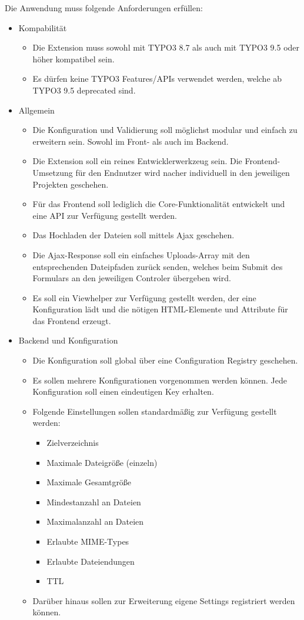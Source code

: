 Die Anwendung muss folgende Anforderungen erfüllen: 
\begin{itemize}[itemsep=0em,partopsep=0em,parsep=0em,topsep=0em]
\item Kompabilität
	\begin{itemize}
		\item Die Extension muss sowohl mit TYPO3 8.7 als auch mit TYPO3 9.5 oder höher kompatibel sein.
		\item Es dürfen keine TYPO3 Features/APIs verwendet werden, welche ab TYPO3 9.5 deprecated sind.
	\end{itemize}
\item Allgemein
	\begin{itemize}
		\item Die Konfiguration und Validierung soll möglichst modular und einfach zu erweitern sein. Sowohl im Front- als auch im Backend.
		\item Die Extension soll ein reines Entwicklerwerkzeug sein. Die Frontend-Umsetzung für den Endnutzer wird nacher individuell in den jeweiligen Projekten geschehen.
		\item Für das Frontend soll lediglich die Core-Funktionalität entwickelt und eine API zur Verfügung gestellt werden.
		\item Das Hochladen der Dateien soll mittels Ajax geschehen.
		\item Die Ajax-Response soll ein einfaches Uploads-Array mit den entsprechenden Dateipfaden zurück senden, welches beim Submit des Formulars an den jeweiligen Controler übergeben wird.
		\item Es soll ein Viewhelper zur Verfügung gestellt werden, der eine Konfiguration lädt und die nötigen HTML-Elemente und Attribute für das Frontend erzeugt.
	\end{itemize}
\item Backend und Konfiguration
	\begin{itemize}
		\item Die Konfiguration soll global über eine Configuration Registry geschehen.
		\item Es sollen mehrere Konfigurationen vorgenommen werden können. Jede Konfiguration soll einen eindeutigen Key erhalten.
		\item Folgende Einstellungen sollen standardmäßig zur Verfügung gestellt werden:
			\begin{itemize}
				\item Zielverzeichnis
				\item Maximale Dateigröße (einzeln)
				\item Maximale Gesamtgröße
				\item Mindestanzahl an Dateien
				\item Maximalanzahl an Dateien
				\item Erlaubte MIME-Types
				\item Erlaubte Dateiendungen
				\item TTL
			\end{itemize}
		\item Darüber hinaus sollen zur Erweiterung eigene Settings registriert werden können. 
	\end{itemize}
\end{itemize}